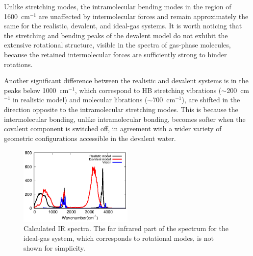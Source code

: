 \documentclass[aps,prl,reprint,amsmath,amssymb]{revtex4-1}
\begin{document}


Unlike stretching modes, the intramolecular bending modes in the region of 1600~cm$^{-1}$ are unaffected by intermolecular forces and remain approximately the same for the realistic, devalent, and ideal-gas systems. 
It is worth noticing that the stretching and bending peaks of the devalent model do not exhibit the extensive rotational structure, visible in the spectra of gas-phase molecules, because the retained intermolecular forces are sufficiently strong to hinder rotations.

Another significant difference between the realistic and devalent systems is in the peaks below 1000~cm$^{-1}$, which correspond to HB stretching vibrations ($\sim$200~cm$^{-1}$ in realistic model) and molecular librations ($\sim$700~cm$^{-1}$), are shifted in the direction opposite to the intramolecular stretching modes. This is because the intermolecular bonding, unlike intramolecular bonding, becomes softer when the covalent component is switched off, in agreement with a wider variety of geometric configurations accessible in the devalent water. 

\begin{figure}
\centering
\includegraphics[width=0.5\textwidth]{new_ir}
\caption{Calculated IR spectra. The far infrared part of the spectrum for the ideal-gas system, which corresponds to rotational modes, is not shown for simplicity. 
} \label{Fig:IR}
\end{figure}
\end{document}
